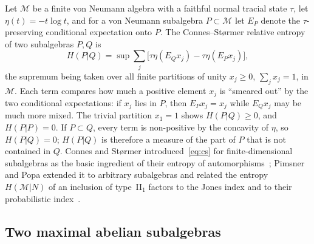\documentclass[11pt]{article}
\newcommand{\M}{\mathcal{M}}
\theoremstyle{plain}
\theoremstyle{definition}
\theoremstyle{remark}
\begin{document}
Let $\M$ be a finite von Neumann algebra with a faithful normal tracial state $\tau$, let $\eta(t)=-t\log t$, and for a
von Neumann subalgebra $P\subset\M$ let $E_P$ denote the $\tau$-preserving conditional expectation onto $P$. The
Connes--St{\o}rmer relative entropy of two subalgebras $P,Q$ is
\begin{equation}\label{eq:cs}
  H(P|Q)=\sup\sum_j\bigl[\tau\eta(E_Qx_j)-\tau\eta(E_Px_j)\bigr],
\end{equation}
the supremum being taken over all finite partitions of unity $x_j\ge0$, $\sum_jx_j=1$, in $\M$. Each term compares how
much a positive element $x_j$ is ``smeared out'' by the two conditional expectations: if $x_j$ lies in $P$, then
$E_Px_j=x_j$ while $E_Qx_j$ may be much more mixed. The trivial partition $x_1=1$ shows $H(P|Q)\ge0$, and $H(P|P)=0$. If
$P\subset Q$, every term is non-positive by the concavity of $\eta$, so $H(P|Q)=0$; $H(P|Q)$ is therefore a measure of the
part of $P$ that is not contained in $Q$. Connes and St{\o}rmer introduced~\eqref{eq:cs} for finite-dimensional
subalgebras as the basic ingredient of their entropy of automorphisms~\cite{connes1975}; Pimsner and Popa extended it to
arbitrary subalgebras and related the entropy $H(\M|N)$ of an inclusion of type~II$_1$ factors to the Jones index and to
their probabilistic index~\cite{pimsner1986,jones1983}.

\subsection{Two maximal abelian subalgebras}
\end{document}
